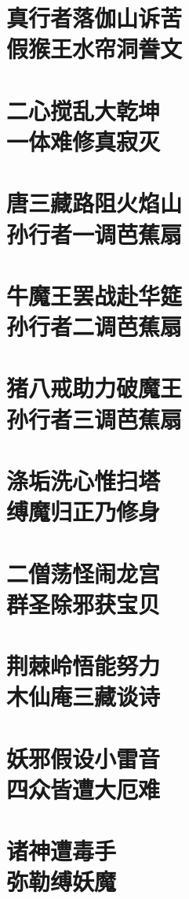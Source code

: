 \documentclass[a4paper,12pt,UTF8,twoside]{ctexbook}
\begin{document}
\chapter[真行者落伽山诉苦\ 假猴王水帘洞誊文]{真行者落伽山诉苦\\假猴王水帘洞誊文}
\chapter[二心搅乱大乾坤\ 一体难修真寂灭]{二心搅乱大乾坤\\一体难修真寂灭}
\chapter[唐三藏路阻火焰山\ 孙行者一调芭蕉扇]{唐三藏路阻火焰山\\孙行者一调芭蕉扇}
\chapter[牛魔王罢战赴华筵\ 孙行者二调芭蕉扇]{牛魔王罢战赴华筵\\孙行者二调芭蕉扇}
\chapter[猪八戒助力破魔王\ 孙行者三调芭蕉扇]{猪八戒助力破魔王\\孙行者三调芭蕉扇}
\chapter[涤垢洗心惟扫塔\ 缚魔归正乃修身]{涤垢洗心惟扫塔\\缚魔归正乃修身}
\chapter[二僧荡怪闹龙宫\ 群圣除邪获宝贝]{二僧荡怪闹龙宫\\群圣除邪获宝贝}
\chapter[荆棘岭悟能努力\ 木仙庵三藏谈诗]{荆棘岭悟能努力\\木仙庵三藏谈诗}
\chapter[妖邪假设小雷音\ 四众皆遭大厄难]{妖邪假设小雷音\\四众皆遭大厄难}
\chapter[诸神遭毒手\ 弥勒缚妖魔]{诸神遭毒手\\弥勒缚妖魔}
\end{document}
